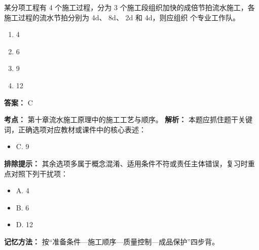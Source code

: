 \documentclass[UTF8,fontset=fandol,11pt]{ctexart}
\begin{document}
\vspace{0.2em}

\begin{quizbox}[title={第 14 题}]
某分项工程有 4 个施工过程，分为 3 个施工段组织加快的成倍节拍流水施工，各施工过程的流水节拍分别为 4d、 8d、 2d 和 4d，则应组织 个专业工作队。\\
\begin{enumerate}[label=\Alph*.]
\item 4
\item 6
\item 9
\item 12
\end{enumerate}
\textbf{答案：} C
\vspace{0.25em}
\begin{answerbox}[title={考点解析}]
\textbf{考点：} 第十章流水施工原理中的施工工艺与顺序。
\textbf{解析：} 本题应抓住题干关键词，正确选项对应教材或课件中的核心表述：
\begin{itemize}
\item C. 9
\end{itemize}
\textbf{排除提示：} 其余选项多属于概念混淆、适用条件不符或责任主体错误，复习时重点对照下列干扰项：
\begin{itemize}
\item A. 4
\item B. 6
\item D. 12
\end{itemize}
\textbf{记忆方法：} 按“准备条件—施工顺序—质量控制—成品保护”四步背。
\end{answerbox}
\end{quizbox}

\vspace{0.2em}
\end{document}
